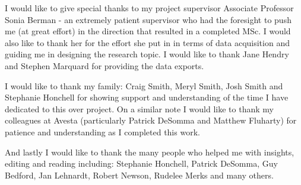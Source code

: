 I would like to give special thanks to my project supervisor Associate Professor Sonia Berman - an extremely patient supervisor who had the foresight to push me (at great effort) in the direction that resulted in a completed MSc. I would also like to thank her for the effort she put in in terms of data acquisition and guiding me in designing the research topic. I would like to thank Jane Hendry and Stephen Marquard for providing the data exports.

I would like to thank my family: Craig Smith, Meryl Smith, Josh Smith and Stephanie Honchell for showing support and understanding of the time I have dedicated to this over project. On a similar note I would like to thank my colleagues at Avesta (particularly Patrick DeSomma and Matthew Fluharty) for patience and understanding as I completed this work.

And lastly I would like to thank the many people who helped me with insights, editing and reading including: Stephanie Honchell, Patrick DeSomma, Guy Bedford, Jan Lehnardt, Robert Newson, Rudelee Merks and many others.